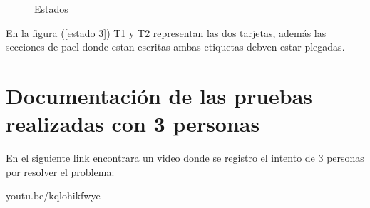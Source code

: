 \documentclass{article}
\begin{document}
\begin{figure}[H]
 \centering
 \caption{Estados}
 \label{f:estados}
\end{figure}

En la figura (\ref{estado 3}) T1 y T2 representan las dos tarjetas, además las secciones de pael donde estan escritas ambas etiquetas debven estar plegadas.


\section{Documentación de las pruebas realizadas con 3 personas}
En el siguiente link encontrara un video donde se registro el intento de 3 personas por resolver el problema:

youtu.be/kqlohikfwye
\end{document}
